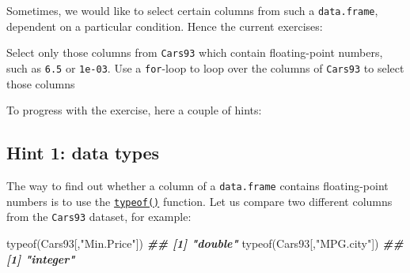 \documentclass[
]{book}
\newenvironment{Shaded}{\begin{snugshade}}{\end{snugshade}}
\newcommand{\DocumentationTok}[1]{\textcolor[rgb]{0.56,0.35,0.01}{\textbf{\textit{#1}}}}
\newcommand{\FunctionTok}[1]{\textcolor[rgb]{0.00,0.00,0.00}{#1}}
\newcommand{\NormalTok}[1]{#1}
\newcommand{\StringTok}[1]{\textcolor[rgb]{0.31,0.60,0.02}{#1}}
\begin{document}
\begin{Shaded}
\end{Shaded}

Sometimes, we would like to select certain columns from such a \texttt{data.frame}, dependent on a particular condition. Hence the current exercises:

Select only those columns from \texttt{Cars93} which contain floating-point numbers, such as \texttt{6.5} or \texttt{1e-03}. Use a \texttt{for}-loop to loop over the columns of \texttt{Cars93} to select those columns

To progress with the exercise, here a couple of hints:

\hypertarget{hint-1-data-types}{%
\subsection{Hint 1: data types}\label{hint-1-data-types}}

The way to find out whether a column of a \texttt{data.frame} contains floating-point numbers is to use the \href{https://stat.ethz.ch/R-manual/R-devel/library/base/html/typeof.html}{\texttt{typeof()}} function. Let us compare two different columns from the \texttt{Cars93} dataset, for example:

\begin{Shaded}
\begin{Highlighting}[]
\FunctionTok{typeof}\NormalTok{(Cars93[,}\StringTok{"Min.Price"}\NormalTok{])}
\DocumentationTok{\#\# [1] "double"}
\FunctionTok{typeof}\NormalTok{(Cars93[,}\StringTok{"MPG.city"}\NormalTok{])}
\DocumentationTok{\#\# [1] "integer"}
\end{Highlighting}
\end{Shaded}
\end{document}
